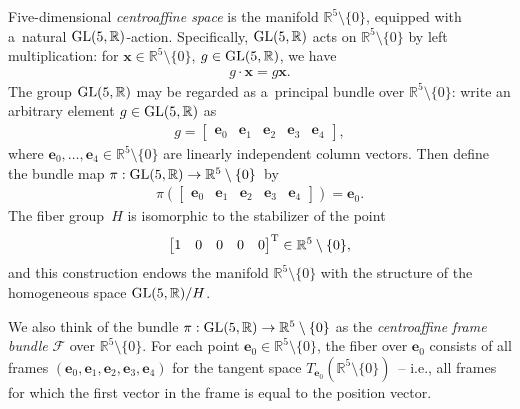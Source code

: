 \documentclass[pdftex]{sigma}
\numberwithin{equation}{section}
\theoremstyle{definition}
\begin{document}
Five-dimensional {\em centroaffine space} is the manifold $\mathbb{R}^5 \setminus \{0\}$, equipped with a~natural ${\rm
GL}(5,\mathbb{R})$-action.
Specif\/ically, ${\rm GL}(5, \mathbb{R})$ acts on $\mathbb{R}^5 \setminus \{0\}$ by left multiplication: for $\mathbf{x}
\in \mathbb{R}^5 \setminus \{0\}$, $g \in {\rm GL}(5, \mathbb{R})$, we have
\begin{gather*}
g \cdot \mathbf{x} = g\mathbf{x}.
\end{gather*}
The group ${\rm GL}(5,\mathbb{R})$ may be regarded as a~principal bundle over $\mathbb{R}^5 \setminus \{0\}$: write an
arbitrary element $g\in {\rm GL}(5,\mathbb{R})$ as
\begin{gather*}
g =
\begin{bmatrix}
\mathbf{e}_0 & \mathbf{e}_1 & \mathbf{e}_2 & \mathbf{e}_3 & \mathbf{e}_4
\end{bmatrix},
\end{gather*}
where $\mathbf{e}_0, \ldots, \mathbf{e}_4 \in \mathbb{R}^5 \setminus \{0\}$ are linearly independent column vectors.
Then def\/ine the bundle map $\pi:{\rm GL}(5,\mathbb{R}) \to \mathbb{R}^5 \setminus \{0\}$~by
\begin{gather}
\pi \left(
\begin{bmatrix}
\mathbf{e}_0 & \mathbf{e}_1 & \mathbf{e}_2 & \mathbf{e}_3 & \mathbf{e}_4
\end{bmatrix}
\right) = \mathbf{e}_0.
\label{define-pi}
\end{gather}
The f\/iber group~$H$ is isomorphic to the stabilizer of the point
\begin{gather*}
\begin{bmatrix}
1 & 0 & 0 & 0 & 0
\end{bmatrix}^{\rm T} \in \mathbb{R}^5 \setminus \{0\},
\end{gather*}
and this construction endows the manifold $\mathbb{R}^5 \setminus \{0\}$ with the structure of the homogeneous space
${\rm GL}(5,\mathbb{R})/H$.

We also think of the bundle $\pi:{\rm GL}(5,\mathbb{R}) \to \mathbb{R}^5 \setminus \{0\}$ as the {\em centroaffine frame
bundle} $\mathcal{F}$ over $\mathbb{R}^5 \setminus \{0\}$.
For each point $\mathbf{e}_0 \in \mathbb{R}^5 \setminus \{0\}$, the f\/iber over $\mathbf{e}_0$ consists of all frames
$(\mathbf{e}_0, \mathbf{e}_1, \mathbf{e}_2, \mathbf{e}_3, \mathbf{e}_4)$ for the tangent space
$T_{\mathbf{e}_0}(\mathbb{R}^5 \setminus \{0\})$~-- i.e., all frames for which the f\/irst vector in the frame is equal to
the position vector.
\end{document}
